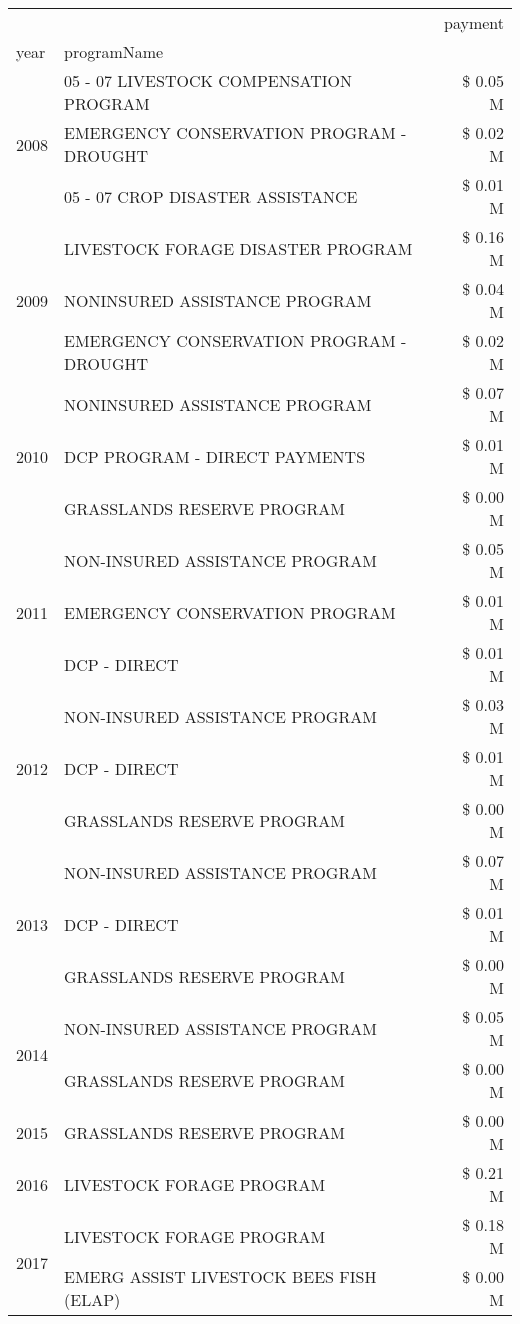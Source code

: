 \begin{tabular}{llr}
\toprule
 &  & payment \\
year & programName &  \\
\midrule
\multirow[t]{3}{*}{2008} & 05 - 07 LIVESTOCK COMPENSATION PROGRAM & \$ 0.05 M \\
 & EMERGENCY CONSERVATION PROGRAM - DROUGHT & \$ 0.02 M \\
 & 05 - 07 CROP DISASTER ASSISTANCE & \$ 0.01 M \\
\cline{1-3}
\multirow[t]{3}{*}{2009} & LIVESTOCK FORAGE DISASTER  PROGRAM & \$ 0.16 M \\
 & NONINSURED ASSISTANCE PROGRAM & \$ 0.04 M \\
 & EMERGENCY CONSERVATION PROGRAM - DROUGHT & \$ 0.02 M \\
\cline{1-3}
\multirow[t]{3}{*}{2010} & NONINSURED ASSISTANCE PROGRAM & \$ 0.07 M \\
 & DCP PROGRAM - DIRECT PAYMENTS & \$ 0.01 M \\
 & GRASSLANDS RESERVE PROGRAM & \$ 0.00 M \\
\cline{1-3}
\multirow[t]{3}{*}{2011} & NON-INSURED ASSISTANCE PROGRAM & \$ 0.05 M \\
 & EMERGENCY CONSERVATION PROGRAM & \$ 0.01 M \\
 & DCP - DIRECT & \$ 0.01 M \\
\cline{1-3}
\multirow[t]{3}{*}{2012} & NON-INSURED ASSISTANCE PROGRAM & \$ 0.03 M \\
 & DCP - DIRECT & \$ 0.01 M \\
 & GRASSLANDS RESERVE PROGRAM & \$ 0.00 M \\
\cline{1-3}
\multirow[t]{3}{*}{2013} & NON-INSURED ASSISTANCE PROGRAM & \$ 0.07 M \\
 & DCP - DIRECT & \$ 0.01 M \\
 & GRASSLANDS RESERVE PROGRAM & \$ 0.00 M \\
\cline{1-3}
\multirow[t]{2}{*}{2014} & NON-INSURED ASSISTANCE PROGRAM & \$ 0.05 M \\
 & GRASSLANDS RESERVE PROGRAM & \$ 0.00 M \\
\cline{1-3}
2015 & GRASSLANDS RESERVE PROGRAM & \$ 0.00 M \\
\cline{1-3}
2016 & LIVESTOCK FORAGE PROGRAM                      & \$ 0.21 M \\
\cline{1-3}
\multirow[t]{2}{*}{2017} & LIVESTOCK FORAGE PROGRAM & \$ 0.18 M \\
 & EMERG ASSIST LIVESTOCK BEES FISH (ELAP) & \$ 0.00 M \\

\end{tabular}
